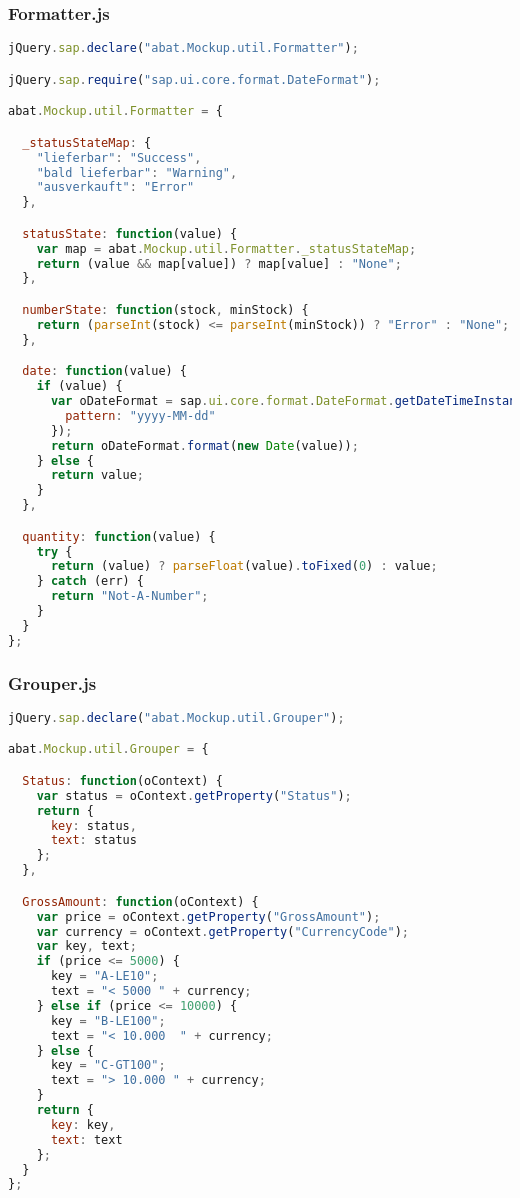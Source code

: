 \newpage
\subsubsection*{Formatter.js}
\begin{lstlisting}[language=JavaScript, label=lst:Formatter.js]
jQuery.sap.declare("abat.Mockup.util.Formatter");

jQuery.sap.require("sap.ui.core.format.DateFormat");

abat.Mockup.util.Formatter = {

  _statusStateMap: {
    "lieferbar": "Success",
    "bald lieferbar": "Warning",
    "ausverkauft": "Error"
  },

  statusState: function(value) {
    var map = abat.Mockup.util.Formatter._statusStateMap;
    return (value && map[value]) ? map[value] : "None";
  },

  numberState: function(stock, minStock) {
    return (parseInt(stock) <= parseInt(minStock)) ? "Error" : "None";
  },

  date: function(value) {
    if (value) {
      var oDateFormat = sap.ui.core.format.DateFormat.getDateTimeInstance({
        pattern: "yyyy-MM-dd"
      });
      return oDateFormat.format(new Date(value));
    } else {
      return value;
    }
  },

  quantity: function(value) {
    try {
      return (value) ? parseFloat(value).toFixed(0) : value;
    } catch (err) {
      return "Not-A-Number";
    }
  }
};
\end{lstlisting}

\newpage
\subsubsection*{Grouper.js}
\begin{lstlisting}[language=JavaScript, label=lst:Grouper.js]
jQuery.sap.declare("abat.Mockup.util.Grouper");

abat.Mockup.util.Grouper = {

  Status: function(oContext) {
    var status = oContext.getProperty("Status");
    return {
      key: status,
      text: status
    };
  },

  GrossAmount: function(oContext) {
    var price = oContext.getProperty("GrossAmount");
    var currency = oContext.getProperty("CurrencyCode");
    var key, text;
    if (price <= 5000) {
      key = "A-LE10";
      text = "< 5000 " + currency;
    } else if (price <= 10000) {
      key = "B-LE100";
      text = "< 10.000  " + currency;
    } else {
      key = "C-GT100";
      text = "> 10.000 " + currency;
    }
    return {
      key: key,
      text: text
    };
  }
};
\end{lstlisting}

